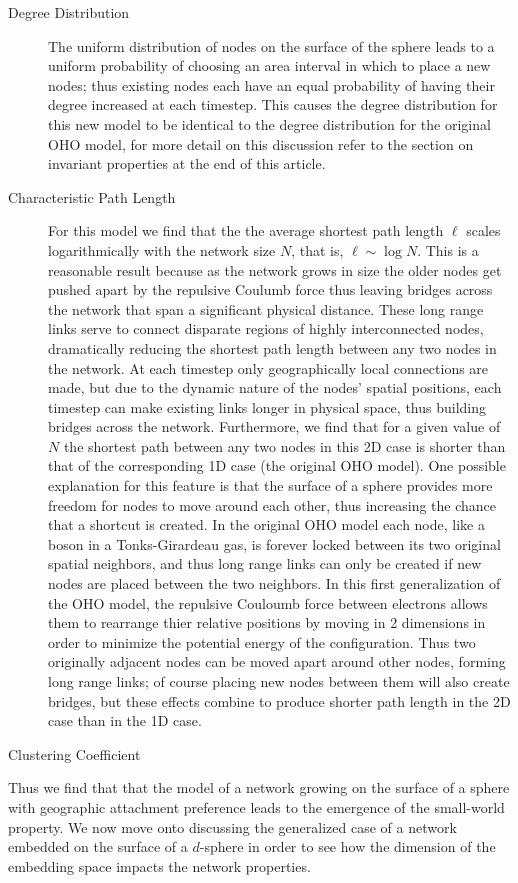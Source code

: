 \documentclass[aps,pre,reprint,superscriptaddress,amsmath,amssymb,nofootinbib]{revtex4-1}
\begin{document}
\begin{description}
  \item[Degree Distribution] The uniform distribution of nodes on the surface of the sphere leads to a uniform probability of choosing an area interval in which to place a new nodes; thus existing nodes each have an equal probability of having their degree increased at each timestep.
This causes the degree distribution for this new model to be identical to the degree distribution for the original OHO model, for more detail on this discussion refer to the section on invariant properties at the end of this article.
  \item[Characteristic Path Length] For this model we find that the the average shortest path length $\ell$ scales logarithmically with the network size $N$, that is, $\ell \sim \log N$. 
This is a reasonable result because as the network grows in size the older nodes get pushed apart by the repulsive Coulumb force thus leaving bridges across the network that span a significant physical distance.
These long range links serve to connect disparate regions of highly interconnected nodes, dramatically reducing the shortest path length between any two nodes in the network.
At each timestep only geographically local connections are made, but due to the dynamic nature of the nodes' spatial positions, each timestep can make existing links longer in physical space, thus building bridges across the network.
Furthermore, we find that for a given value of $N$ the shortest path between any two nodes in this 2D case is shorter than that of the corresponding 1D case (the original OHO model).
One possible explanation for this feature is that the surface of a sphere provides more freedom for nodes to move around each other, thus increasing the chance that a shortcut is created.
In the original OHO model each node, like a boson in a Tonks-Girardeau gas, is forever locked between its two original spatial neighbors, and thus long range links can only be created if new nodes are placed between the two neighbors.
In this first generalization of the OHO model, the repulsive Couloumb force between electrons allows them to rearrange thier relative positions by moving in 2 dimensions in order to minimize the potential energy of the configuration.
Thus two originally adjacent nodes can be moved apart around other nodes, forming long range links; of course placing new nodes between them will also create bridges, but these effects combine to produce shorter path length in the 2D case than in the 1D case.
  \item[Clustering Coefficient] 
\end{description}
Thus we find that that the model of a network growing on the surface of a sphere with geographic attachment preference leads to the emergence of the small-world property.
We now move onto discussing the generalized case of a network embedded on the surface of a $d$-sphere in order to see how the dimension of the embedding space impacts the network properties.
\end{document}
